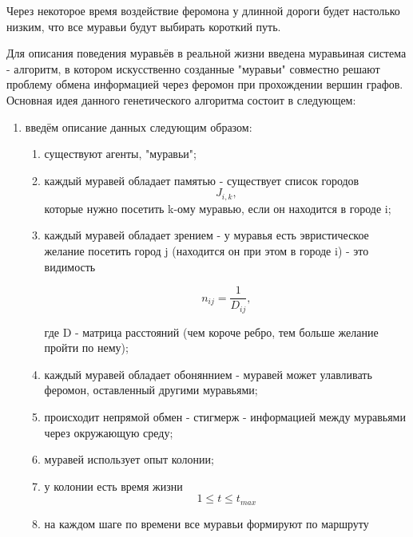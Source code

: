 \documentclass[../main.tex]{subfiles}
\begin{document}
	Через некоторое время воздействие феромона у длинной дороги будет настолько низким, что все муравьи будут выбирать короткий путь.\cite{ACS}
	
	Для описания поведения муравьёв в реальной жизни введена муравьиная система - алгоритм, в котором искусственно созданные "муравьи" совместно решают проблему обмена информацией через феромон при прохождении вершин графов. Основная идея данного генетического алгоритма состоит в следующем:
	
	\begin{enumerate}[1)]
		\item введём описание данных следующим образом:
		\begin{enumerate}
			\item существуют агенты, "муравьи";
			\item каждый муравей обладает памятью - существует список городов 
			\begin{equation}
				\label{eq2.1} 
				J_{i,k}, 
			\end{equation} 
			которые нужно посетить k-ому муравью, если он находится в городе i;
			
			\item каждый муравей обладает зрением - у муравья есть эвристическое желание посетить город j (находится он при этом в городе i) - это видимость 
			
			\begin{equation}
				\label{eq2.2}
				n_{ij} = \frac {1} {D_{ij}},
			\end{equation}
			
			где D - матрица расстояний (чем короче ребро, тем больше желание пройти по нему);
			
			\item каждый муравей обладает обоняннием - муравей может улавливать феромон, оставленный другими муравьями;
			
			\item происходит непрямой обмен - стигмерж - информацией между муравьями через окружающую среду;
			
			\item муравей использует опыт колонии;
			
			\item у колонии есть время жизни 
			\begin{equation}
				\label{eq2.3}
				1 \leqslant t \leqslant t_{max}
			\end{equation}
			
			\item на каждом шаге по времени все муравьи формируют по маршруту 
			

\end{enumerate}
\end{enumerate}
\end{document}
